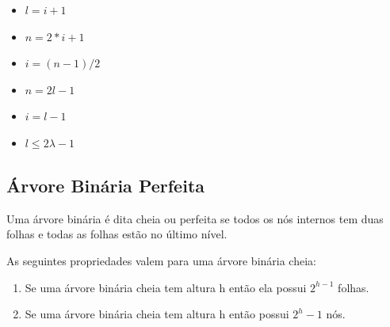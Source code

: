 \begin{itemize}
    \item $l = i+1$
    \item  $n = 2*i + 1$
    \item $i = (n-1)/2$
    \item $n = 2l - 1$
    \item $i = l-1$
    \item $l \leq 2\lambda - 1$
\end{itemize}





\subsection{Árvore Binária Perfeita}

Uma árvore binária é dita cheia ou perfeita se todos os nós internos tem duas folhas e todas as folhas estão no último nível.

As seguintes propriedades valem para uma árvore binária cheia:

\begin{enumerate}
    \item Se uma árvore binária cheia tem altura h então ela possui $2^{h-1}$ folhas.
    \item Se uma árvore binária cheia tem altura h então possui $2^{h} - 1$ nós.
\end{enumerate}


